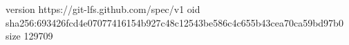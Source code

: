 version https://git-lfs.github.com/spec/v1
oid sha256:693426fcd4e07077416154b927c48c12543be586c4c655b43cea70ca59bd97b0
size 129709
